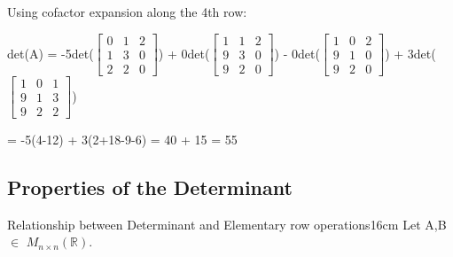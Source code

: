     \begin{tbox}
        Using cofactor expansion along the 4th row:

        \hspace{0.5cm}
        det(A)
        = -5det($\begin{bmatrix}
                    0 & 1 & 2 \\
                    1 & 3 & 0 \\
                    2 & 2 & 0    
                \end{bmatrix}$)
        + 0det($\begin{bmatrix}
                    1 & 1 & 2 \\
                    9 & 3 & 0 \\
                    9 & 2 & 0    
                \end{bmatrix}$)
        - 0det($\begin{bmatrix}
                    1 & 0 & 2 \\
                    9 & 1 & 0 \\
                    9 & 2 & 0    
                \end{bmatrix}$)
        + 3det($\begin{bmatrix}
                    1 & 0 & 1 \\
                    9 & 1 & 3 \\
                    9 & 2 & 2    
                \end{bmatrix}$)

        \hspace{1.9cm}
        = -5(4-12) + 3(2+18-9-6)
        = 40 + 15 = 55
    \end{tbox}

    \vspace{0.5cm}





\subsection{ Properties of the Determinant }

    \begin{wtheorem}{Relationship between Determinant and Elementary
    row operations}{16cm}
        Let A,B $\in$ $M_{n \times n}(\mathbb{R})$.
    \end{wtheorem}

